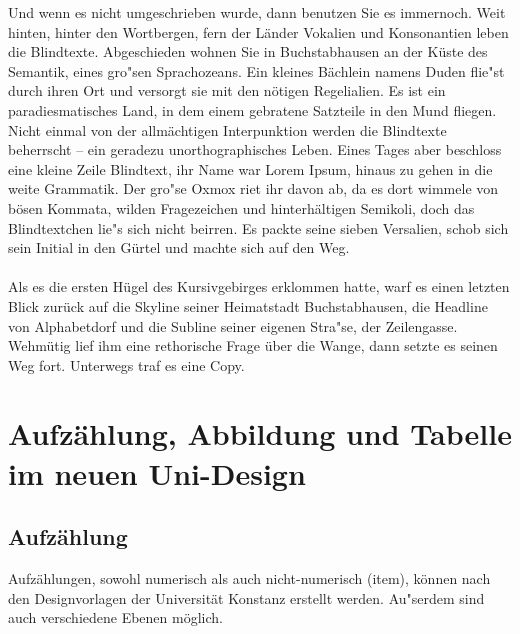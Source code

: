 \documentclass[11pt, rgb]{scrreprt}
\begin{document}
Und wenn es nicht umgeschrieben wurde, dann benutzen Sie es immernoch. Weit hinten, hinter den Wortbergen, fern der Länder Vokalien und Konsonantien leben die Blindtexte. Abgeschieden wohnen Sie in Buchstabhausen an der Küste des Semantik, eines gro"sen Sprachozeans. Ein kleines Bächlein namens Duden flie"st durch ihren Ort und versorgt sie mit den nötigen Regelialien. Es ist ein paradiesmatisches Land, in dem einem gebratene Satzteile in den Mund fliegen. Nicht einmal von der allmächtigen Interpunktion werden die Blindtexte beherrscht – ein geradezu unorthographisches Leben. Eines Tages aber beschloss eine kleine Zeile Blindtext, ihr Name war Lorem Ipsum, hinaus zu gehen in die weite Grammatik. Der gro"se Oxmox riet ihr davon ab, da es dort wimmele von bösen Kommata, wilden Fragezeichen und hinterhältigen Semikoli, doch das Blindtextchen lie"s sich nicht beirren. Es packte seine sieben Versalien, schob sich sein Initial in den Gürtel und machte sich auf den Weg.\\
\\
Als es die ersten Hügel des Kursivgebirges erklommen hatte, warf es einen letzten Blick zurück auf die Skyline seiner Heimatstadt Buchstabhausen, die Headline von Alphabetdorf und die Subline seiner eigenen Stra"se, der Zeilengasse. Wehmütig lief ihm eine rethorische Frage über die Wange, dann setzte es seinen Weg fort. Unterwegs traf es eine Copy.

\normalsize

\chapter{Aufzählung, Abbildung und Tabelle im neuen Uni-Design}




%
%
%
%

\section{Aufzählung}

Aufzählungen, sowohl numerisch als auch nicht-numerisch (item), können nach den Designvorlagen der Universität Konstanz erstellt werden. Au"serdem sind auch verschiedene Ebenen möglich.\\
\end{document}
